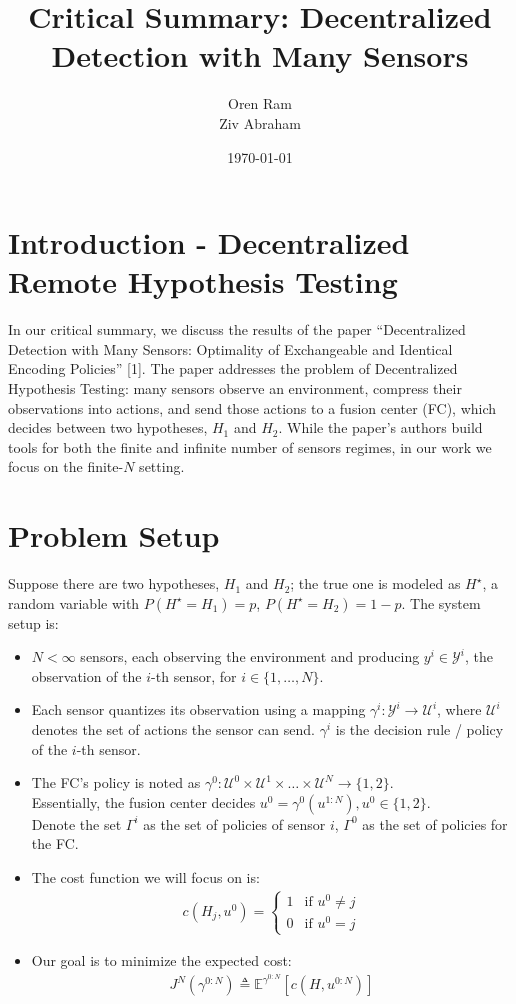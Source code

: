 \documentclass[11pt]{article}
\title{Critical Summary: Decentralized Detection with Many Sensors}
\author{Oren Ram \\ Ziv Abraham}
\date{\today}
\newcommand{\HS}{H^\star}
\begin{document}
\maketitle

\section{Introduction - Decentralized Remote Hypothesis Testing}
In our critical summary, we discuss the results of the paper ``Decentralized Detection with Many Sensors: Optimality of Exchangeable and Identical Encoding Policies'' [1]. 
The paper addresses the problem of Decentralized Hypothesis Testing: many sensors observe an environment, compress their observations into actions, 
and send those actions to a fusion center (FC), which decides between two hypotheses, $H_1$ and $H_2$. While the paper's authors build 
tools for both the finite and infinite number of sensors regimes, in our work we focus on the 
finite-$N$ setting. %

\section{Problem Setup}

Suppose there are two hypotheses, $H_1$ and $H_2$;
the true one is modeled as $\HS$, a random variable with $P(\HS = H_1) = p$, $P(\HS = H_2) = 1-p$. The system setup is:
\begin{itemize}
    \item $N < \infty$ sensors, each observing the environment and producing $y^i \in \mathcal{Y}^i$, the observation of the $i$-th sensor, for $i \in \{1,\dots, N\}$.
    \item Each sensor quantizes its observation using a mapping $\gamma^i: \mathcal{Y}^i \to \mathcal{U}^i$, where $\mathcal{U}^i$ denotes the set of actions the sensor can send.
    $\gamma^i$ is the decision rule / policy of the $i$-th sensor.
    \item The FC's policy is noted as $\gamma^0: \mathcal{U}^0 \times \mathcal{U}^1 \times \dots \times \mathcal{U}^N \to \{1,2\}$.\\
    Essentially, the fusion center decides $u^0 = \gamma^0(u^{1:N}), u^0 \in \{1,2\}$.\\
    Denote the set $\Gamma^i$ as the set of policies of sensor $i$, $\Gamma^0$ as the set of policies for the FC.
    \item The cost function we will focus on is:
    \begin{align}
        c(H_j,u^0)= 
                        \begin{cases}
                            1 & \text{if } u^0 \neq j \\
                            0 & \text{if } u^0 = j
                        \end{cases}
    \end{align}
    \item Our goal is to minimize the expected cost:
    \begin{align}
        J^N(\gamma^{0:N}) \triangleq \mathbb{E}^{\gamma^{0:N}}[c(H,u^{0:N})]
    \end{align}
\end{itemize}
\newpage
\end{document}
